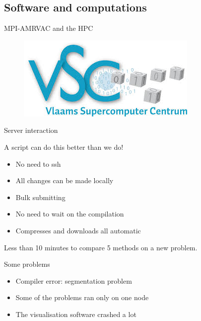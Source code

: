 \subsection{Software and computations}

\begin{frame}{MPI-AMRVAC and the HPC}


\begin{figure}
\centering
\includegraphics[width=0.7\linewidth]{../../figs/vsc}
\label{fig:vsc}
\end{figure}

\end{frame}


\begin{frame}{Server interaction}

A script can do this better than we do!

\begin{itemize}
\item No need to ssh
\item All changes can be made locally 
\item Bulk submitting
\item No need to wait on the compilation
\item Compresses and downloads all automatic
\end{itemize}

Less than 10 minutes to compare 5 methods on a new problem.
\end{frame}

\begin{frame}{Some problems}
\vspace{2cm}
\begin{itemize}
\item Compiler error: segmentation problem
\item Some of the problems ran only on one node 
\item The visualisation software crashed a lot
\end{itemize}

\end{frame}